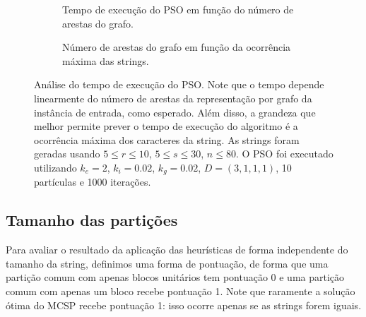         \begin{figure}[htb]
            \centering
            \begin{subfigure}[b]{0.48\textwidth}
                \centering
                \caption{Tempo de execução do PSO em função do número de arestas do grafo.}
                \label{fig:tempo-pso-vs-arestas}
            \end{subfigure} \hfill
            \begin{subfigure}[b]{0.48\textwidth}
                \centering
                \caption{Número de arestas do grafo em função da ocorrência máxima das strings.}
                \label{fig:tempo-pso-arestas-vs-occ}
            \end{subfigure}
            \caption{Análise do tempo de execução do PSO. Note que o tempo depende linearmente do número de arestas da representação por grafo da instância de entrada, como esperado. Além disso, a grandeza que melhor permite prever o tempo de execução do algoritmo é a ocorrência máxima dos caracteres da string. As strings foram geradas usando $5 \leq r \leq 10$, $5 \leq s \leq 30$, $n \leq 80$. O PSO foi executado utilizando $k_e = 2$, $k_i = 0.02$, $k_g = 0.02$, $D = (3, 1, 1, 1)$, 10 partículas e 1000 iterações.}
            \label{fig:tempo-pso}
        \end{figure}

\subsection{Tamanho das partições} \label{sec:resultados-tamanho}

    Para avaliar o resultado da aplicação das heurísticas de forma independente do tamanho da string, definimos uma forma de pontuação, de forma que uma partição comum com apenas blocos unitários tem pontuação 0 e uma partição comum com apenas um bloco recebe pontuação 1. Note que raramente a solução ótima do MCSP recebe pontuação 1: isso ocorre apenas se as strings forem iguais.

